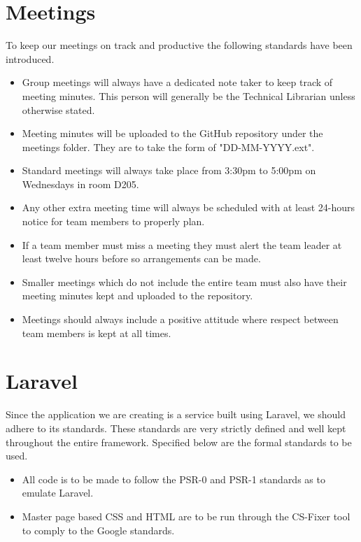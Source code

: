\documentclass[]{article}
\begin{document}
\section{Meetings}
To keep our meetings on track and productive the following standards have been introduced.
\begin{itemize}
	\item Group meetings will always have a dedicated note taker to keep track of meeting minutes. This person will generally be the Technical Librarian unless otherwise stated.
	\item Meeting minutes will be uploaded to the GitHub repository under the meetings folder. They are to take the form of "DD-MM-YYYY.ext".
	\item Standard meetings will always take place from 3:30pm to 5:00pm on Wednesdays in room D205.
	\item Any other extra meeting time will always be scheduled with at least 24-hours notice for team members to properly plan.
	\item If a team member must miss a meeting they must alert the team leader at least twelve hours before so arrangements can be made.
	\item Smaller meetings which do not include the entire team must also have their meeting minutes kept and uploaded to the repository.
	\item Meetings should always include a positive attitude where respect between team members is kept at all times.
\end{itemize}

\section{Laravel}
Since the application we are creating is a service built using Laravel, we should adhere to its standards. These standards are very strictly defined and well kept throughout the entire framework. Specified below are the formal standards to be used.
\begin{itemize}
	\item All code is to be made to follow the PSR-0 and PSR-1 standards as to emulate Laravel.\cite{laravelCite}
	\item Master page based CSS and HTML are to be run through the CS-Fixer tool to comply to the Google standards.\cite{googleCite}
\end{itemize}
\end{document}
